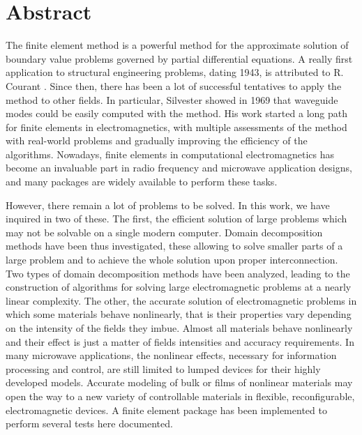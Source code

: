 \chapter*{Abstract}
The finite element method is a powerful method for the approximate solution of boundary value problems governed by partial differential equations. A really first application to structural engineering problems, dating 1943, is attributed to R. Courant \cite{courant1943variational}. Since then, there has been a lot of successful tentatives to apply the method to other fields. In particular, Silvester showed in 1969 \cite{silvester1969finite, coccioli1996finite} that waveguide modes could be easily computed with the method. His work started a long path for finite elements in electromagnetics, with multiple assessments of the method with real-world problems and gradually improving the efficiency of the algorithms. Nowadays, finite elements in computational electromagnetics has become an invaluable part in radio frequency and microwave application designs, and many packages are widely available to perform these tasks. 

However, there remain a lot of problems to be solved. In this work, we have inquired in two of these. 
The first, the efficient solution of large problems which may not be solvable on a single modern computer. Domain decomposition methods have been thus investigated, these allowing to solve smaller parts of a large problem and to achieve the whole solution upon proper interconnection. Two types of domain decomposition methods have been analyzed, leading to the construction of algorithms for solving large electromagnetic problems at a nearly linear complexity. 
The other, the accurate solution of electromagnetic problems in which some materials behave nonlinearly, that is their properties vary depending on the intensity of the fields they imbue. Almost all materials behave nonlinearly and their effect is just a matter of fields intensities and accuracy requirements. In many microwave applications, the nonlinear effects, necessary for information processing and control, are still limited to lumped devices for their highly developed models. Accurate modeling of bulk or films of nonlinear materials may open the way to a new variety of controllable materials in flexible, reconfigurable, electromagnetic devices. A finite element package has been implemented to perform several tests here documented.


